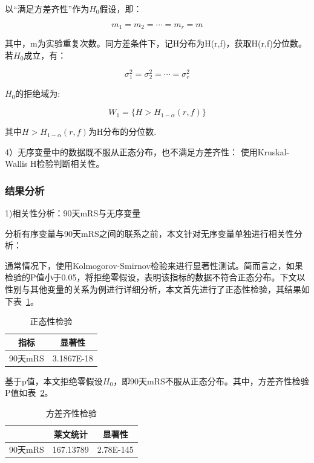 \documentclass[bwprint]{gmcmthesis}
\begin{document}
以“满足方差齐性”作为$H_0$假设，即：

\begin{equation}
m_1=m_2=\cdots=m_r=m
\end{equation}

其中，m为实验重复次数。同方差条件下，记H分布为H(r,f)，获取H(r,f)分位数。若$H_0$成立，有：

\begin{equation}
\sigma_1^2=\sigma_2^2=\cdots=\sigma_r^2
\end{equation}

$H_0$的拒绝域为:

\begin{equation}
W_1=\{H>H_{1-\alpha}(r,f)\}
\end{equation}

\noindent 其中$H>H_{1-\alpha}(r,f)$为H分布的分位数.

4）无序变量中的数据既不服从正态分布，也不满足方差齐性：
使用Kruskal-Wallis H检验判断相关性。


\subsubsection{结果分析}



1)相关性分析：90天mRS与无序变量

分析有序变量与90天mRS之间的联系之前，本文针对无序变量单独进行相关性分析：

通常情况下，使用Kolmogorov-Smirnov检验来进行显著性测试。简而言之，如果检验的P值小于0.05，将拒绝零假设，表明该指标的数据不符合正态分布。下文以性别与其他变量的关系为例进行详细分析，本文首先进行了正态性检验，其结果如下表~\ref{正态性检验}。


\begin{table}[!ht]
    \centering
    \caption{正态性检验}
    \label{正态性检验}
    \begin{tabular}{cc}
        \toprule
        指标 & 显著性 \\
        \midrule
        90天mRS & 3.1867E-18 \\
        \bottomrule
    \end{tabular}
\end{table}



基于p值，本文拒绝零假设$H_0$，即90天mRS不服从正态分布。其中，方差齐性检验P值如表~\ref{方差齐性检验}。

\begin{table}[!ht]
    \centering
    \caption{方差齐性检验}
    \label{方差齐性检验}
    \begin{tabular}{lcc}
    \hline
        &莱文统计 & 显著性 \\ \hline
        90天mRS & 167.13789 & 2.78E-145 \\ \hline
    \end{tabular}
\end{table}
\end{document}
